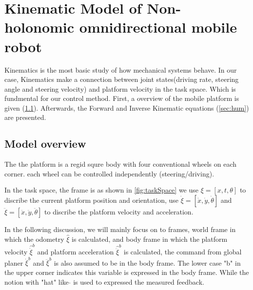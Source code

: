 \chapter{Kinematic Model of Non-holonomic omnidirectional mobile robot}
\label{cha:Kinematic}

Kinematics is the most basic study of how mechanical systems behave. In our case, Kinematics make a connection between joint states(driving rate, steering angle and steering velocity) and platform velocity in the 
task space. Which is fundmental for our control method.
First, a overview of the mobile platform is given (\cref{sec:model_overview}).
Afterwards, the Forward and Inverse Kinematic equations (\cref{sec:hum}) are presented.

\section{Model overview}
\label{sec:model_overview}

The the platform is a regid squre body with four conventional wheels on each corner. each wheel can be controlled independently (steering/driving).

In the task space, the frame is as shown in \cref{fig:taskSpace} we use $ \xi = [x,t,\theta]$ to discribe the current platform position and orientation, use $ \dot{\xi} = [\dot{x},\dot{y},\dot{\theta}] $ and 
$ \ddot{\xi}= [\ddot{x},\ddot{y},\ddot{\theta}] $ to discribe the platform velocity and acceleration. 

In the following discussion, we will mainly focus on to frames, world frame in which the odometry $ \hat{\xi} $ is calculated, and body frame in which the platform velocity $\hat{\dot{\xi}}^b$ and platform 
acceleration $ \hat{\ddot{\xi}}^b $ is calculated, the command from global planer $ \dot{\xi}^b $ and $ \ddot{\xi}^b $ is also assumed to be in the body frame. The lower case "b" in the upper corner indicates 
this variable is expressed in the body frame. While the notion with "hat" like $\hat{}$  is used to expressed the measured feedback.

